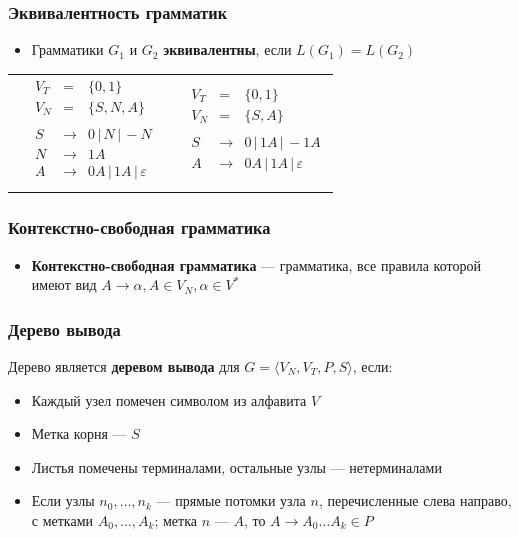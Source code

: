 \documentclass{beamer}
\begin{document}
\begin{frame}[fragile]
  \transwipe[direction=90]
  \frametitle{Эквивалентность грамматик}
  \begin{itemize}
    \item Грамматики $G_1$ и $G_2$ \textbf{эквивалентны}, если $L(G_1) = L(G_2)$ \pause
  \end{itemize}
  
\begin{tabular}{p{6cm}  p{6cm}}

$$
\begin{array}{crcl}
&V_T &=& \{ 0, 1 \} \\
&V_N &=& \{ S, N, A \} \\~\\
&S& \rightarrow & 0 \, | \, N \, | \, - N  \\
&N& \rightarrow & 1 A \\
&A& \rightarrow & 0 A \, | \, 1 A  \, | \, \varepsilon\\
\end{array}
$$

& \pause

$$
\begin{array}{crcl}
&V_T &=& \{ 0, 1 \} \\
&V_N &=& \{ S, A \} \\~\\
&S& \rightarrow & 0 \, | \, 1 A  \, | \, - 1 A  \\
&A& \rightarrow &  0 A \, | \, 1 A  \, | \, \varepsilon\\
\end{array}
$$

\end{tabular}  
  
\end{frame}

\begin{frame}[fragile]
  \transwipe[direction=90]
  \frametitle{Контекстно-свободная грамматика}
  \begin{itemize}
    \item \textbf{Контекстно-свободная грамматика} --- грамматика, все правила которой имеют вид $A \rightarrow \alpha, A \in V_N, \alpha \in V^*$
  \end{itemize}
\end{frame}

\begin{frame}[fragile]
  \transwipe[direction=90]
  \frametitle{Дерево вывода}
  
  Дерево является \textbf{деревом вывода} для $G = \langle V_N, V_T, P, S\rangle$, если:  
  \begin{itemize}
    \item Каждый узел помечен символом из алфавита $V$
    \item Метка корня --- $S$
    \item Листья помечены терминалами, остальные узлы --- нетерминалами
    \item Если узлы $n_0, \dots, n_k$ --- прямые потомки узла $n$, перечисленные слева направо, с метками $A_0, \dots, A_k$; метка $n$ --- $A$, то $A \rightarrow A_0 \dots A_k \in P$
  \end{itemize}
\end{frame}
\end{document}
